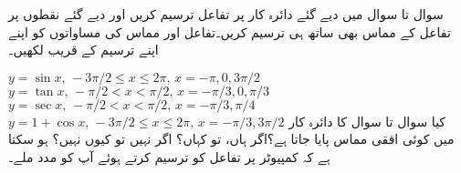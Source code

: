 سوال  تا سوال  میں دیے گئے دائرہ کار پر تفاعل ترسیم کریں اور دیے گئے نقطوں پر تفاعل کے مماس بھی ساتھ ہی ترسیم کریں۔تفاعل اور مماس کی مساواتوں کو اپنے اپنے ترسیم کے قریب لکھیں۔

$y=\sin x,\, -3\pi/2\le x\le 2\pi,\, x=-\pi,0,3\pi/2$
$y=\tan x,\, -\pi/2<x<\pi/2,\,x=-\pi/3,0,\pi/3$
$y=\sec x,\, -\pi/2<x<\pi/2,\, x=-\pi/3,\pi/4$
$y=1+\cos x,\, -3\pi/2\le x\le 2\pi,\, x=-\pi/3,3\pi/2$
کیا سوال  تا سوال  کا دائرہ کار  میں کوئی افقی مماس پایا جاتا ہے؟اگر ہاں، تو کہاں؟ اگر نہیں تو کیوں نہیں؟ ہو سکتا ہے کہ کمپیوٹر پر تفاعل کو ترسیم کرتے ہوئے آپ کو مدد ملے۔

